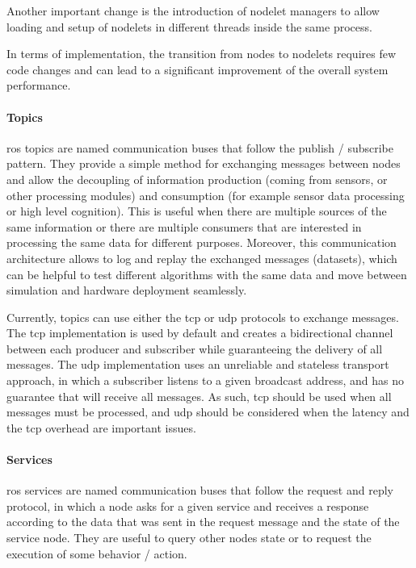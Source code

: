 Another important change is the introduction of nodelet managers to allow loading and setup of nodelets in different threads inside the same process.

In terms of implementation, the transition from nodes to nodelets requires few code changes and can lead to a significant improvement of the overall system performance.


\paragraph{Topics}

\gls{ros} topics are named communication buses that follow the publish / subscribe pattern. They provide a simple method for exchanging messages between nodes and allow the decoupling of information production (coming from sensors, or other processing modules) and consumption (for example sensor data processing or high level cognition). This is useful when there are multiple sources of the same information or there are multiple consumers that are interested in processing the same data for different purposes. Moreover, this communication architecture allows to log and replay the exchanged messages (datasets), which can be helpful to test different algorithms with the same data and move between simulation and hardware deployment seamlessly.

Currently, topics can use either the \gls{tcp} or \gls{udp} protocols to exchange messages. The \gls{tcp} implementation is used by default and creates a bidirectional channel between each producer and subscriber while guaranteeing the delivery of all messages. The \gls{udp} implementation uses an unreliable and stateless transport approach, in which a subscriber listens to a given broadcast address, and has no guarantee that will receive all messages. As such, \gls{tcp} should be used when all messages must be processed, and \gls{udp} should be considered when the latency and the \gls{tcp} overhead are important issues.


\paragraph{Services}

\gls{ros} services are named communication buses that follow the request and reply protocol, in which a node asks for a given service and receives a response according to the data that was sent in the request message and the state of the service node. They are useful to query other nodes state or to request the execution of some behavior / action.


